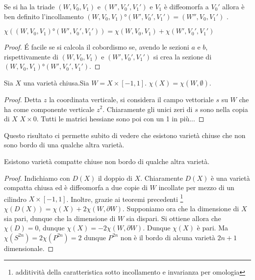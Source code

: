 \begin{defn}
Se si ha la triade $(W, V_0, V_1)$ e $(W', V_0', V_1')$ e $V_1$ è diffeomorfa a $V_0'$ allora è ben definito l'incollamento $(W, V_0, V_1)°(W', V_0', V_1')=(W'', V_0, V_1')$ .
\end{defn}
\begin{teo}
$\chi((W, V_0, V_1)°(W', V_0', V_1'))=\chi(W, V_0, V_1)+\chi(W', V_0', V_1')$
\end{teo}
\begin{proof}
\'E facile se si calcola il cobordismo se, avendo le sezioni $a$ e $b$, rispettivamente di $(W, V_0, V_1)$ e $(W', V_0', V_1')$ si crea la sezione di $(W, V_0, V_1)°(W', V_0', V_1')$.
\end{proof}

\begin{teo}
Sia $X$ una varietà chiusa.Sia $W=X\times [-1,1]$. $\chi(X)=\chi(W, \emptyset)$.   
\end{teo}
\begin{proof}
Detta $z$ la coordinata verticale, si considera il campo vettoriale $s$ su $W$ che ha come componente verticale $z^2$. Chiaramente gli unici zeri di $s$ sono nella copia di $X$ $X\times{0}$. Tutti le matrici hessiane sono poi con un 1 in più...
\end{proof}

Questo risultato ci permette subito di vedere che esistono varietà chiuse che non sono bordo di una qualche altra varietà.
\begin{teo}
Esistono varietà compatte chiuse non bordo di qualche altra varietà.%
\end{teo}
\begin{proof}
Indichiamo con $D(X)$ il doppio di $X$. Chiaramente $D(X)$ è una varietà compatta chiusa ed è diffeomorfa a due copie di $W$ incollate per mezzo di un cilindro $X\times [-1, 1]$. Inoltre, grazie ai teoremi precedenti \footnote{additività della caratteristica sotto incollamento e invarianza per omologia} $\chi(D(X))=\chi(X)+2\chi(W, \partial W)$. Supponiamo ora che la dimensione di $X$ sia pari, dunque che la dimensione di $W$ sia dispari. Si ottiene allora che $\chi(D)=0$, dunque $\chi(X)=-2\chi(W, \partial W)$. Dunque $\chi(X)$ è pari. Ma $\chi(S^{2n})=2\chi(P^{2n})=2$ dunque $P^{2n}$ non è il bordo di alcuna varietà $2n+1$ dimensionale. 
\end{proof}


